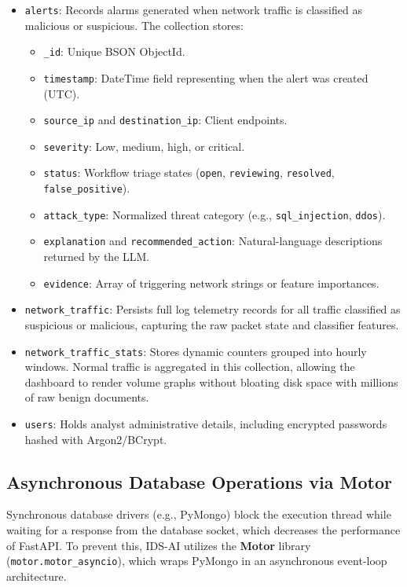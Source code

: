 \documentclass[12pt,a4paper]{report}
\begin{document}
\begin{itemize}[leftmargin=1.5em]
  \item \texttt{alerts}: Records alarms generated when network traffic is classified as malicious or suspicious. The collection stores:
    \begin{itemize}
      \item \texttt{\_id}: Unique BSON ObjectId.
      \item \texttt{timestamp}: DateTime field representing when the alert was created (UTC).
      \item \texttt{source\_ip} and \texttt{destination\_ip}: Client endpoints.
      \item \texttt{severity}: Low, medium, high, or critical.
      \item \texttt{status}: Workflow triage states (\texttt{open}, \texttt{reviewing}, \texttt{resolved}, \texttt{false\_positive}).
      \item \texttt{attack\_type}: Normalized threat category (e.g., \texttt{sql\_injection}, \texttt{ddos}).
      \item \texttt{explanation} and \texttt{recommended\_action}: Natural-language descriptions returned by the LLM.
      \item \texttt{evidence}: Array of triggering network strings or feature importances.
    \end{itemize}
  \item \texttt{network\_traffic}: Persists full log telemetry records for all traffic classified as suspicious or malicious, capturing the raw packet state and classifier features.
  \item \texttt{network\_traffic\_stats}: Stores dynamic counters grouped into hourly windows. Normal traffic is aggregated in this collection, allowing the dashboard to render volume graphs without bloating disk space with millions of raw benign documents.
  \item \texttt{users}: Holds analyst administrative details, including encrypted passwords hashed with Argon2/BCrypt.
\end{itemize}

\subsection{Asynchronous Database Operations via Motor}

Synchronous database drivers (e.g., PyMongo) block the execution thread while waiting for a response from the database socket, which decreases the performance of FastAPI. To prevent this, IDS-AI utilizes the \textbf{Motor} library (\texttt{motor.motor\_asyncio}), which wraps PyMongo in an asynchronous event-loop architecture.
\end{document}
